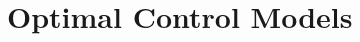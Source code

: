 \documentclass[12pt, oneside]{article}   	%
\begin{document}
\nocite{*}

\section{Optimal Control Models}



\end{document}
